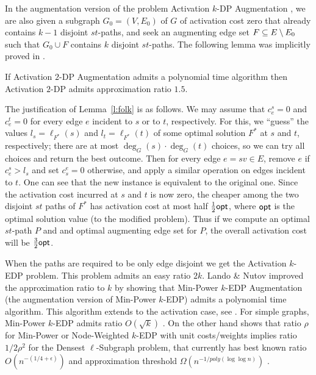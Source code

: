 \documentclass[a4paper,UKenglish,autoref]{lipics-v2019}
\begin{document}
In the augmentation version of the problem {\sc Activation $k$-DP Augmentation} , 
we are also given a subgraph $G_0=(V,E_0)$ of $G$ of activation cost zero that 
already contains $k-1$ disjoint $st$-paths, and seek an augmenting edge set 
$F \subseteq E \setminus E_0$ such that $G_0 \cup F$ contains $k$ disjoint $st$-paths.
The following lemma was implicitly proved in \cite{AE}. 

\begin{lemma} [\cite{AE}] \label{l:folk}
If {\sc Activation $2$-DP Augmentation} admits a polynomial time algorithm then {\sc Activation $2$-DP}  admits approximation ratio $1.5$.
\end{lemma}

The justification of Lemma~\ref{l:folk} is as follows. 
We may assume that $c_e^s=0$ and $c_e^t=0$ for every edge $e$ incident to $s$ or to $t$, respectively. 
For this, we ``guess'' the values $l_s=\ell_{F^*}(s)$ and $l_t=\ell_{F^*}(t)$ of some optimal solution $F^*$ at $s$ and $t$, respectively;
there are at most  $\deg_G(s) \cdot \deg_G(t)$ choices, so we can try all choices and return the best outcome.
Then for every edge $e=sv \in E$, remove  $e$ if $c_e^s> l_s$ and set $c^e_s=0$ otherwise, 
and apply a similar operation on edges incident to $t$. 
One can see that the new instance is equivalent to the original one.
Since the activation cost incurred at $s$ and $t$ is now zero, 
the cheaper among the two disjoint $st$ paths of $F^*$ has activation cost at most half $\frac{1}{2}{\sf opt}$, 
where ${\sf opt}$ is the optimal solution value (to the modified problem). 
Thus if we compute an optimal $st$-path $P$ and and optimal augmenting edge set for $P$,
the overall activation cost will be $\frac{3}{2}{\sf opt}$. 

When the paths are required to be only edge disjoint we get the {\sc Activation $k$-EDP} problem. 
This problem admits an easy ratio $2k$. 
Lando \& Nutov \cite{LN} improved the approximation ratio to $k$ 
by showing that {\sc Min-Power $k$-EDP Augmentation} (the augmentation version of {\sc Min-Power $k$-EDP})
admits a polynomial time algorithm.
This algorithm extends to the activation case, see \cite{N-sur}.  
For simple graphs, {\sc Min-Power $k$-EDP} admits ratio $O(\sqrt{k})$ \cite{N-kedp}.
On the other hand \cite{N-snw} shows that ratio $\rho$ for {\sc Min-Power} or {\sc Node-Weighted $k$-EDP} 
with unit costs/weights implies ratio $1/2\rho^2$ for the {\sc Densest $\ell$-Subgraph} problem,
that currently has best known ratio $O(n^{-(1/4+\epsilon)})$ \cite{BCCF} 
and approximation threshold $\Omega\left(n^{-1/poly (\log \log n)}\right)$ \cite{M}.
\end{document}
